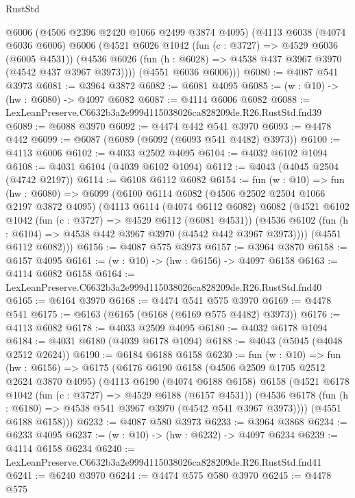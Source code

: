 \begin{lexlean}{RustStd}
\begin{coremodule}
      @6006
      (@4506 @2396 @2420 @1066 @2499 @3874 @4095)
      (@4113
        @6038
        (@4074 @6036 @6006)
        @6006
        (@4521
          @6026
          @1042
          (fun (c : @3727) => @4529 @6036 (@6005 @4531))
          (@4536 @6026 (fun (h : @6028) => @4538 @437 @3967 @3970 (@4542 @437 @3967 @3973))))
        (@4551 @6036 @6006)))
@6080 := @4087 @541 @3973
@6081 := @3964 @3872
@6082 := @6081 @4095
@6085 := (w : @10) -> (hw : @6080) -> @4097 @6082
@6087 := @4114 @6006 @6082
@6088 := LexLeanPreserve.C6632b3a2e999d115038026ca828209de.R26.RustStd.fnd39
@6089 := @6088 @3970
@6092 := @4474 @442 @541 @3970
@6093 := @4478 @442
@6099 := @6087 (@6089 (@6092 (@6093 @541 @4482) @3973))
@6100 := @4113 @6006
@6102 := @4033 @2502 @4095
@6104 := @4032 @6102 @1094
@6108 := @4031 @6104 (@4039 @6102 @1094)
@6112 := @4043 (@4045 @2504 (@4742 @2197))
@6114 := @6108 @6112 @6082
@6154 := fun (w : @10) =>
  fun (hw : @6080) =>
  @6099
    (@6100
      @6114
      @6082
      (@4506 @2502 @2504 @1066 @2197 @3872 @4095)
      (@4113
        @6114
        (@4074 @6112 @6082)
        @6082
        (@4521
          @6102
          @1042
          (fun (c : @3727) => @4529 @6112 (@6081 @4531))
          (@4536 @6102 (fun (h : @6104) => @4538 @442 @3967 @3970 (@4542 @442 @3967 @3973))))
        (@4551 @6112 @6082)))
@6156 := @4087 @575 @3973
@6157 := @3964 @3870
@6158 := @6157 @4095
@6161 := (w : @10) -> (hw : @6156) -> @4097 @6158
@6163 := @4114 @6082 @6158
@6164 := LexLeanPreserve.C6632b3a2e999d115038026ca828209de.R26.RustStd.fnd40
@6165 := @6164 @3970
@6168 := @4474 @541 @575 @3970
@6169 := @4478 @541
@6175 := @6163 (@6165 (@6168 (@6169 @575 @4482) @3973))
@6176 := @4113 @6082
@6178 := @4033 @2509 @4095
@6180 := @4032 @6178 @1094
@6184 := @4031 @6180 (@4039 @6178 @1094)
@6188 := @4043 (@5045 (@4048 @2512 @2624))
@6190 := @6184 @6188 @6158
@6230 := fun (w : @10) =>
  fun (hw : @6156) =>
  @6175
    (@6176
      @6190
      @6158
      (@4506 @2509 @1705 @2512 @2624 @3870 @4095)
      (@4113
        @6190
        (@4074 @6188 @6158)
        @6158
        (@4521
          @6178
          @1042
          (fun (c : @3727) => @4529 @6188 (@6157 @4531))
          (@4536 @6178 (fun (h : @6180) => @4538 @541 @3967 @3970 (@4542 @541 @3967 @3973))))
        (@4551 @6188 @6158)))
@6232 := @4087 @580 @3973
@6233 := @3964 @3868
@6234 := @6233 @4095
@6237 := (w : @10) -> (hw : @6232) -> @4097 @6234
@6239 := @4114 @6158 @6234
@6240 := LexLeanPreserve.C6632b3a2e999d115038026ca828209de.R26.RustStd.fnd41
@6241 := @6240 @3970
@6244 := @4474 @575 @580 @3970
@6245 := @4478 @575

\end{coremodule}
\end{lexlean}
